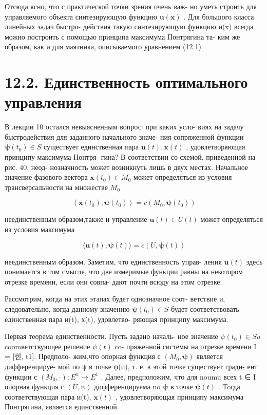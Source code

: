 \documentclass[8pt]{extarticle}
\begin{document}
Отсюда ясно, что с практической точки зрения очень важ- но уметь строить для управляемого объекта синтезирующую функцию \(\mathbf{u}\left( \mathbf{x}\right)\) . Для большого класса линейных задач быстро- действия такую синтезирующую функцию и(x) всегда можно построить с помощью принципа максимума Понтрягина та- ким же образом, как и для маятника, описываемого уравнением (12.1).

\section*{12.2. Единственность оптимального управления}

В лекции 10 остался невыясненным вопрос: при каких усло- виях на задачу быстродействия для заданного начального значе- ния сопряженной функции \(\mathbf{\psi }\left( {t}_{0}\right)  \in  S\) существует единственная пара \(\mathbf{u}\left( t\right) ,\mathbf{x}\left( t\right)\) , удовлетворяющая принципу максимума Понтря- гина? В соответствии со схемой, приведенной на рис. 40, неод- нозначность может возникнуть лишь в двух местах. Начальное значение фазового вектора \(\mathbf{x}\left( {t}_{0}\right) \in  {M}_{0}\) может определяться из условия трансверсальности на множестве \({M}_{0}\)

\[
\left\langle  {\mathbf{x}\left( {t}_{0}\right) ,\mathbf{\psi }\left( {t}_{0}\right) }\right\rangle   = c\left( {{M}_{0},\mathbf{\psi }\left( {t}_{0}\right) }\right) \tag{12.5}
\]

неединственным образом,также и управление \(\mathbf{u}\left( t\right)  \in  U\left( t\right)\) может определяться из условия максимума

\[
\langle \mathbf{u}\left( t\right) ,\mathbf{\psi }\left( t\right) \rangle  = c\left( {U,\mathbf{\psi }\left( t\right) }\right) \tag{12.6}
\]

неединственным образом. Заметим, что единственность управ- ления \(\mathbf{u}\left( t\right)\) здесь понимается в том смысле, что две измеримые функции равны на некотором отрезке времени, если они совпа- дают почти всюду на этом отрезке.

Рассмотрим, когда на этих этапах будет однозначное соот- ветствие и, следовательно, когда данному значению \(\mathbf{\psi }\left( {t}_{0}\right)  \in  S\) будет соответствовать единственная пара и(t), х(t), удовлетво- ряющая принципу максимума.

Первая теорема единственности. Пусть задано началь- ное значение \(\psi \left( {t}_{0}\right)  \in  {Su}\) coomветствующее решение \(\psi \left( t\right)\) co- пряженной системы на отрезке времени I = [힌, t1]. Предполо- жим,что опорная функция с \(\left( {{M}_{0},\mathbf{\psi }}\right)\) является дифференцируе- мой по ψ в точке ψ(и), т. е. в этой точке существует гради- ент функции с \(\left( {{M}_{0}, \cdot  }\right)  : {E}^{n} \rightarrow  {E}^{1}\) . Далее, предположим, что для noumu всех t ∈ I опорная функция с \(\left( {U,\psi }\right)\) дифференцируема no \(\mathbf{\psi }\) в точке \(\mathbf{\psi }\left( t\right)\) . Toгда соответствующая пара и(t), \(\mathbf{x}\left( t\right)\) , удовлетворяющая принципу максимума Понтрягина, является единственной.
\end{document}
